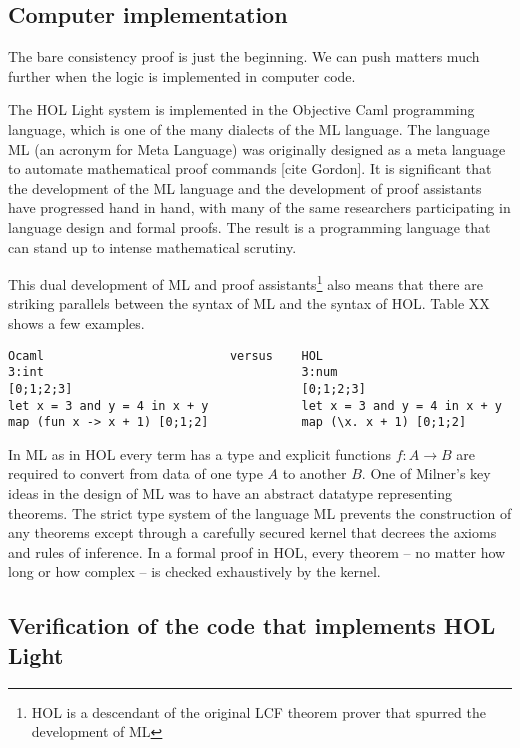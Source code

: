 \documentclass[brochure,english,12pt]{bourbaki}
\theoremstyle{plain}
\begin{document}
\subsection{Computer implementation}

The bare consistency proof is just the beginning.  We can push matters  much further when
the logic is implemented in computer code.

The HOL Light system is implemented in the Objective Caml programming language, which is one of the many dialects of the ML
language.  The language ML (an acronym for Meta Language) was originally designed as a
meta language to automate mathematical proof commands [cite Gordon].  It is significant that the development
of the ML language and the development of proof assistants have progressed hand in hand, with many
of the same researchers participating in language design and formal proofs.  
The result is a programming language that can stand up to intense mathematical scrutiny.

This dual development of ML and proof assistants\footnote{HOL is a descendant of the original LCF theorem prover that
spurred the development of ML} also means that there are striking parallels between
the syntax of ML and the syntax of HOL.    Table XX shows a few examples.

\begin{lstlisting}[keepspaces=true,stringstyle=\tt,basicstyle=\small,frame=single,framesep=8pt,mathescape,morekeywords={type,let,and,in},columns=flexible,caption={Ocaml syntax compared with HOL syntax}]
Ocaml                          versus    HOL
3:int                                    3:num
[0;1;2;3]                                [0;1;2;3]  
let x = 3 and y = 4 in x + y             let x = 3 and y = 4 in x + y
map (fun x -> x + 1) [0;1;2]             map (\x. x + 1) [0;1;2]
\end{lstlisting}

In ML as in HOL every term has a type and explicit functions $f:A\to B$ are required to convert from data of one type $A$ to another $B$.
One of Milner's key ideas in the design of ML was to have an abstract datatype representing theorems.
The strict type system of the language ML prevents the construction of any theorems except through
a carefully secured kernel that decrees the axioms and rules of inference.  In a formal proof in HOL, 
every theorem -- no matter how long or how complex -- is checked exhaustively by the kernel.

\subsection{Verification of the code that implements HOL Light}
\end{document}
